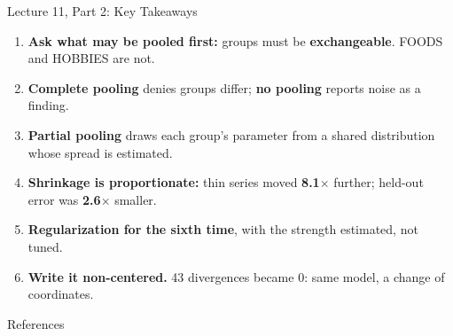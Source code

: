 \documentclass[aspectratio=169, 11pt]{beamer}
\begin{document}
\begin{frame}{Lecture 11, Part 2: Key Takeaways}
  \begin{keybox}
    {\footnotesize
    \begin{enumerate}\itemsep2pt
      \item \textbf{Ask what may be pooled first:} groups must be \textbf{exchangeable}. FOODS
            and HOBBIES are not.

      \item \textbf{Complete pooling} denies groups differ; \textbf{no pooling} reports noise as a
            finding.

      \item \textbf{Partial pooling} draws each group's parameter from a shared distribution
            whose spread is estimated.

      \item \textbf{Shrinkage is proportionate:} thin series moved \textbf{8.1$\times$} further;
            held-out error was \textbf{2.6$\times$} smaller.

      \item \textbf{Regularization for the sixth time}, with the strength estimated, not tuned.

      \item \textbf{Write it non-centered.} 43 divergences became 0: same model, a change of
            coordinates.
    \end{enumerate}
    }
  \end{keybox}
\end{frame}

\begin{frame}[allowframebreaks]{References}
  \printbibliography[heading=none]
\end{frame}
\end{document}

